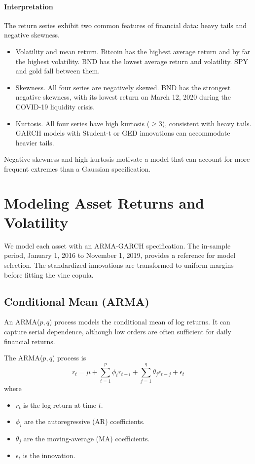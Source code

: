 \documentclass[12pt,a4paper]{article}
\begin{document}
\paragraph{Interpretation}
The return series exhibit two common features of financial data: heavy tails and negative skewness.
\begin{itemize}
  \item Volatility and mean return. Bitcoin has the highest average return and by far the highest volatility. BND has the lowest average return and volatility. SPY and gold fall between them.
  \item Skewness. All four series are negatively skewed. BND has the strongest negative skewness, with its lowest return on March 12, 2020 during the COVID-19 liquidity crisis.
  \item Kurtosis. All four series have high kurtosis ($\geq 3$), consistent with heavy tails. GARCH models with Student-t or GED innovations can accommodate heavier tails.
\end{itemize}
Negative skewness and high kurtosis motivate a model that can account for more frequent extremes than a Gaussian specification.

\section{Modeling Asset Returns and Volatility}

We model each asset with an ARMA-GARCH specification. The in-sample period, January 1, 2016 to November 1, 2019, provides a reference for model selection. The standardized innovations are transformed to uniform margins before fitting the vine copula.

\subsection{Conditional Mean (ARMA)}

An ARMA($p,q$) process models the conditional mean of log returns. It can capture serial dependence, although low orders are often sufficient for daily financial returns.

The ARMA($p,q$) process is
\[
r_t = \mu + \sum_{i=1}^{p} \phi_i r_{t-i} + \sum_{j=1}^{q} \theta_j \epsilon_{t-j} + \epsilon_t
\]
where
\begin{itemize}
  \item $r_t$ is the log return at time $t$.
  \item $\phi_i$ are the autoregressive (AR) coefficients.
  \item $\theta_j$ are the moving-average (MA) coefficients.
  \item $\epsilon_t$ is the innovation.
\end{itemize}
\end{document}
